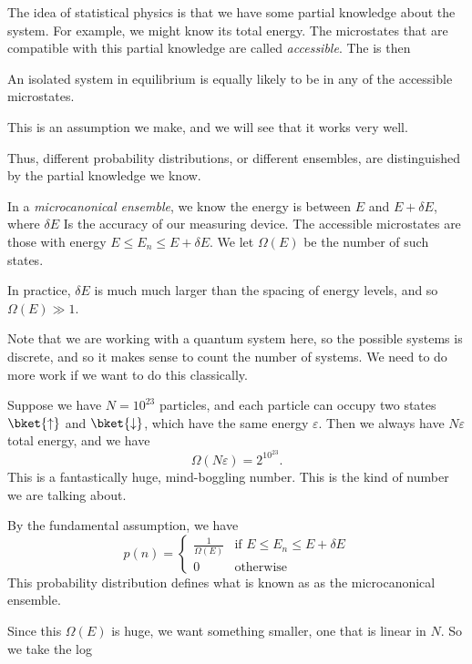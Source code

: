 \documentclass[a4paper]{article}
\begin{document}
The idea of statistical physics is that we have some partial knowledge about the system. For example, we might know its total energy. The microstates that are compatible with this partial knowledge are called \emph{accessible}. The  is then
\begin{significant}
  An isolated system in equilibrium is equally likely to be in any of the accessible microstates.
\end{significant}
This is an assumption we make, and we will see that it works very well.

Thus, different probability distributions, or different ensembles, are distinguished by the partial knowledge we know.
\begin{defi}
  In a \emph{microcanonical ensemble}, we know the energy is between $E$ and $E + \delta E$, where $\delta E$ Is the accuracy of our measuring device. The accessible microstates are those with energy $E \leq E_n \leq E + \delta E$. We let $\Omega(E)$ be the number of such states.
\end{defi}
In practice, $\delta E$ is much much larger than the spacing of energy levels, and so $\Omega(E) \gg 1$.

Note that we are working with a quantum system here, so the possible systems is discrete, and so it makes sense to count the number of systems. We need to do more work if we want to do this classically.

\begin{eg}
  Suppose we have $N = 10^{23}$ particles, and each particle can occupy two states $\bket{\uparrow}$ and $\bket{\downarrow}$, which have the same energy $\varepsilon$. Then we always have $N\varepsilon$ total energy, and we have
  \[
    \Omega(N\varepsilon) = 2^{10^{23}}.
  \]
  This is a fantastically huge, mind-boggling number. This is the kind of number we are talking about.
\end{eg}

By the fundamental assumption, we have
\[
  p(n) =
  \begin{cases}
    \frac{1}{\Omega(E)} & \text{if } E \leq E_n \leq E + \delta E\\
    0 & \text{otherwise}
  \end{cases}
\]
This probability distribution defines what is known as as the microcanonical ensemble.

Since this $\Omega(E)$ is huge, we want something smaller, one that is linear in $N$. So we take the log
\end{document}
